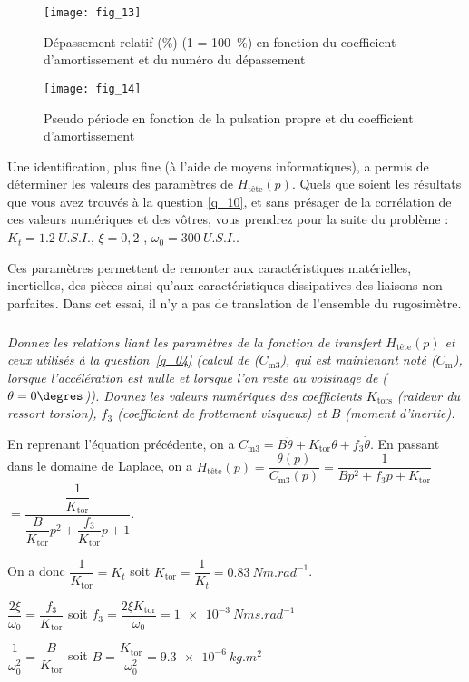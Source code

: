 \ifprof
\else
\begin{minipage}[c]{.47\linewidth}
\begin{figure}[H]
\centering
\texttt{[image: fig\_13]}
\caption{\label{fig_13} Dépassement relatif (\%) (1 = 100~\%) en fonction
du coefficient d’amortissement et du numéro du dépassement}
\end{figure}
\end{minipage}\hfill
\begin{minipage}[c]{.47\linewidth}
\begin{figure}[H]
\centering
\texttt{[image: fig\_14]}
\caption{\label{fig_14} Pseudo période en fonction de la pulsation
propre et du coefficient d’amortissement}
\end{figure}
\end{minipage}

\vspace{.25cm}

Une identification, plus fine (à l’aide de moyens informatiques), a permis de déterminer les valeurs des
paramètres de $H_{\text{tête}}(p)$. Quels que soient les résultats que vous avez trouvés à la question \ref{q_10}, et sans
présager de la corrélation de ces valeurs numériques et des vôtres, vous prendrez pour la suite du
problème : $K_t =\SI{1,2}{U.S.I.}$, $\xi = 0,2$ , $\omega_0 = \SI{300}{U.S.I.}$.


Ces paramètres permettent de remonter aux caractéristiques matérielles, inertielles, des pièces ainsi qu’aux
caractéristiques dissipatives des liaisons non parfaites. Dans cet essai, il n’y a pas de translation de
l’ensemble du rugosimètre.
\fi



\subparagraph{\label{q_11}}\textit{Donnez les relations liant les paramètres de la fonction de transfert 
$H_{\text{tête}}(p)$ et ceux utilisés à la question~\ref{q_04} (calcul de ($C_{\text{m3}}$), qui est maintenant noté
($C_{\text{m}}$), lorsque l’accélération est nulle et lorsque l’on reste au voisinage de ($\theta=0\degres$)).
Donnez les valeurs numériques des coefficients $K_{\text{tors}}$ (raideur du ressort torsion), $f_3$ (coefficient de
frottement visqueux) et $B$ (moment d’inertie). }
\ifprof
\begin{corrige}
En reprenant l'équation précédente, on a $ C_{\text{m3}} = B\ddot{\theta}  + K_{\text{tor}}\theta+ f_3 \dot{\theta}   $.
En passant dans le domaine de Laplace, on a $H_{\text{tête}}(p) = \dfrac{\theta(p)}{C_{\text{m3}}(p)} = \dfrac{1}{Bp^2+f_3p+K_{\text{tor}}}$ $= \dfrac{\dfrac{1}{K_{\text{tor}}}}{\dfrac{B}{K_{\text{tor}}}p^2+\dfrac{f_3}{K_{\text{tor}}}p+1}$.

On a donc $\dfrac{1}{K_{\text{tor}}} = K_t$ soit $K_{\text{tor}}=\dfrac{1}{K_t} = \SI{0,83}{Nm.rad^{-1}}$. 

$\dfrac{2\xi}{\omega_0} = \dfrac{f_3}{K_{\text{tor}}}$ soit $f_3 = \dfrac{2\xi K_{\text{tor}} }{\omega_0} = \SI{1e-3}{Nms.rad^{-1}}$

$\dfrac{1}{\omega_0^2} = \dfrac{B}{K_{\text{tor}}}$ soit $B=\dfrac{K_{\text{tor}}}{\omega_0^2 } = \SI{9,3e-6}{kg.m^2}$
\end{corrige}
\else
\fi


